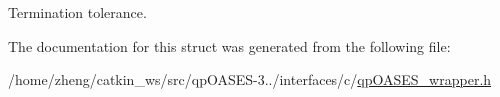 Termination tolerance. 

The documentation for this struct was generated from the following file\+:\begin{DoxyCompactItemize}
\item 
/home/zheng/catkin\+\_\+ws/src/qp\+O\+A\+S\+E\+S-\/3../interfaces/c/\hyperlink{qp_o_a_s_e_s__wrapper_8h}{qp\+O\+A\+S\+E\+S\+\_\+wrapper.\+h}\end{DoxyCompactItemize}
